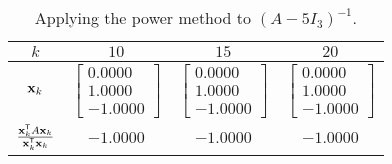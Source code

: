\begin{activity}
\begin{table}[h]
\begin{center}
\renewcommand{\arraystretch}{2.0}
\begin{tabular}{cccc} \hline
$k$			&$10$		&$15$		&$20$		\\ \hline %
$\mathbf{x}_k$		&$\left[ \begin{array}{r} 0.0000 \\ 1.0000 \\ -1.0000 \end{array} \right]$	&$\left[ \begin{array}{r} 0.0000 \\ 1.0000 \\ -1.0000 \end{array} \right]$	&$\left[ \begin{array}{r} 0.0000 \\ 1.0000 \\ -1.0000 \end{array} \right]$		\\ \hline %
$\frac{\mathbf{x}_k^{\mathsf{T}}A\mathbf{x}_k}{\mathbf{x}_k^{\mathsf{T}}\mathbf{x}_k}$ 	&$-1.0000$	&$-1.0000$	&$-1.0000$		\\ \hline %
\end{tabular}
\caption{Applying the power method to $(A - 5I_3)^{-1}$.}
\label{T:4_e_4}
\end{center}
\end{table}




	\ea
	
\end{activity}

\label{sec:app_eigen_exam}
\ExampleIntro

